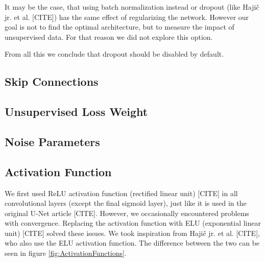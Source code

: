 It may be the case, that using batch normalization instead or dropout (like Hajič jr. et al. [CITE]) has the same effect of regularizing the network. However our goal is not to find the optimal architecture, but to measure the impact of unsupervised data. For that reason we did not explore this option.

From all this we conclude that dropout should be disabled by default.


\subsection{Skip Connections}
\label{sec:SkipConnections}


\subsection{Unsupervised Loss Weight}
\label{sec:UnsupervisedLossWeight}



\subsection{Noise Parameters}
\label{sec:NoiseParameters}



\subsection{Activation Function}
\label{sec:ActivationFunction}

We first used ReLU activation function (rectified linear unit) [CITE] in all convolutional layers (except the final sigmoid layer), just like it is used in the original U-Net article [CITE]. However, we occasionally encountered problems with convergence. Replacing the activation function with ELU (exponential linear unit) [CITE] solved these issues. We took inspiration from Hajič jr. et al. [CITE], who also use the ELU activation function. The difference between the two can be seen in figure \ref{fig:ActivationFunctions}.

